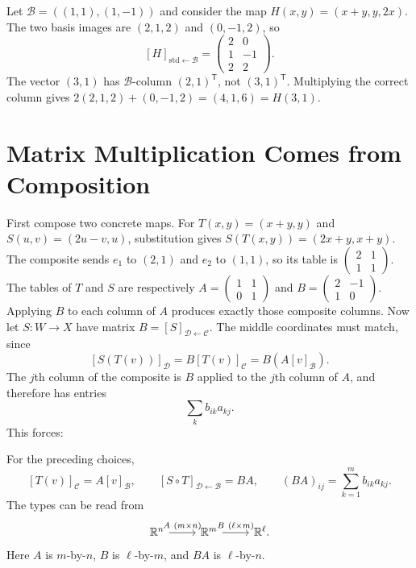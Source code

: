 \begin{example}
Let $\mathcal B=((1,1),(1,-1))$ and consider the map
$H(x,y)=(x+y,y,2x)$. The two basis images
are $(2,1,2)$ and $(0,-1,2)$, so
\[
[H]_{\mathrm{std}\leftarrow\mathcal B}
=\begin{pmatrix}2&0\\1&-1\\2&2\end{pmatrix}.
\]
The vector $(3,1)$ has $\mathcal B$-column $(2,1)^{\mathsf T}$, not
$(3,1)^{\mathsf T}$. Multiplying the correct column gives
$2(2,1,2)+(0,-1,2)=(4,1,6)=H(3,1)$.
\end{example}
\section{Matrix Multiplication Comes from Composition}
First compose two concrete maps. For $T(x,y)=(x+y,y)$ and
$S(u,v)=(2u-v,u)$, substitution gives $S(T(x,y))=(2x+y,x+y)$.
The composite sends $e_1$ to $(2,1)$ and $e_2$ to $(1,1)$, so its table is
$\left(\begin{matrix}2&1\\1&1\end{matrix}\right)$.
The tables of $T$ and $S$ are respectively
$A=\left(\begin{matrix}1&1\\0&1\end{matrix}\right)$ and
$B=\left(\begin{matrix}2&-1\\1&0\end{matrix}\right)$.
Applying $B$ to each column of $A$ produces exactly those composite columns.
Now let $S:W\to X$ have matrix $B=[S]_{\mathcal D\leftarrow\mathcal C}$.
The middle coordinates must match, since
\[
[S(T(v))]_{\mathcal D}=B[T(v)]_{\mathcal C}
=B(A[v]_{\mathcal B}).
\]
The $j$th column of the composite is $B$ applied to the $j$th column
of $A$, and therefore has entries
\[
\sum_k b_{ik}a_{kj}.
\]
 This forces:
\begin{proposition}
\label{prop:linear-coordinate}
For the preceding choices,
\[
[T(v)]_{\mathcal C}=A[v]_{\mathcal B},\qquad
[S\circ T]_{\mathcal D\leftarrow\mathcal B}=BA,\qquad
(BA)_{ij}=\sum_{k=1}^m b_{ik}a_{kj}.
\]
The types can be read from
\[
\begin{tikzcd}
\R^n\arrow[r,"A\ (m\times n)"]&\R^m\arrow[r,"B\ (\ell\times m)"]&\R^\ell.
\end{tikzcd}
\]
Here $A$ is $m$-by-$n$, $B$ is $\ell$-by-$m$, and $BA$ is
$\ell$-by-$n$.
\end{proposition}
